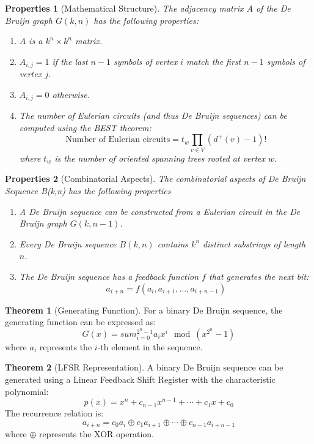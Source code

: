 \documentclass{article}
\newtheorem{properties}{Properties}
\theoremstyle{definition}
\def\sum{sum}%
\newtheorem{theorem}{Theorem}
\begin{document}
\begin{properties}[Mathematical Structure]
The adjacency matrix $A$ of the De Bruijn graph $G(k, n)$ has the following properties:
\begin{enumerate}
    \item $A$ is a $k^n \times k^n$ matrix.
    \item $A_{i,j} = 1$ if the last $n-1$ symbols of vertex $i$ match the first $n-1$ symbols of vertex $j$.
    \item $A_{i,j} = 0$ otherwise.
    \item The number of Eulerian circuits (and thus De Bruijn sequences) can be computed using the BEST theorem:
    \begin{equation}
        \text{Number of Eulerian circuits} = t_w \prod_{v \in V} (d^+(v) - 1)!
    \end{equation}
    where $t_w$ is the number of oriented spanning trees rooted at vertex $w$.
\end{enumerate}
\end{properties}

\begin{properties}[Combinatorial Aspects] The combinatorial aspects of De Bruijn Sequence B(k,n) has the following properties
\begin{enumerate}
    \item A De Bruijn sequence can be constructed from a Eulerian circuit in the De Bruijn graph $G(k, n-1)$.
    \item Every De Bruijn sequence $B(k, n)$ contains $k^n$ distinct substrings of length $n$.
    \item The De Bruijn sequence has a feedback function $f$ that generates the next bit:
    \begin{equation}
        a_{i+n} = f(a_i, a_{i+1}, \ldots, a_{i+n-1})
    \end{equation}
\end{enumerate}
\end{properties}
\begin{theorem}[Generating Function]
For a binary De Bruijn sequence, the generating function can be expressed as:
\begin{equation}
    G(x) = \sum_{i=0}^{2^n-1} a_i x^i \mod (x^{2^n} - 1)
\end{equation}
where $a_i$ represents the $i$-th element in the sequence.
\end{theorem}

\begin{theorem}[LFSR Representation]
A binary De Bruijn sequence can be generated using a Linear Feedback Shift Register with the characteristic polynomial:
\begin{equation}
    p(x) = x^n + c_{n-1}x^{n-1} + \cdots + c_1x + c_0
\end{equation}
The recurrence relation is:
\begin{equation}
    a_{i+n} = c_0a_i \oplus c_1a_{i+1} \oplus \cdots \oplus c_{n-1}a_{i+n-1}
\end{equation}
where $\oplus$ represents the XOR operation.
\end{theorem}
\end{document}
